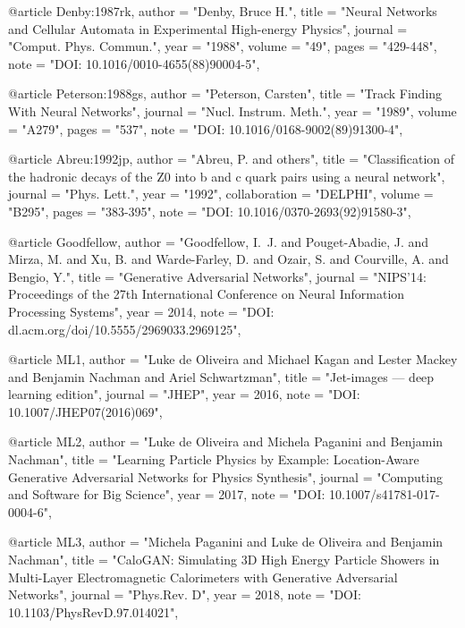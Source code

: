 @article{
	Denby:1987rk,
    author  = "Denby, Bruce H.",
    title   = "Neural Networks and Cellular Automata in Experimental High-energy Physics",
    journal = "Comput. Phys. Commun.",
    year    = "1988",
    volume  = "49",
    pages   = "429-448",
    note    = "DOI: 10.1016/0010-4655(88)90004-5",
}

@article{
	Peterson:1988gs,
    author  = "Peterson, Carsten",
    title   = "Track Finding With Neural Networks",
    journal = "Nucl. Instrum. Meth.",
    year    = "1989",
    volume  = "A279",
    pages   = "537",
    note    = "DOI: 10.1016/0168-9002(89)91300-4",
}

@article{
	Abreu:1992jp,
    author  = "Abreu, P. and others",
    title   = "Classification of the hadronic decays of the Z0 into b and c quark pairs using a neural network",
    journal = "Phys. Lett.",
    year    = "1992",
    collaboration   = "DELPHI",
    volume  = "B295",
    pages   = "383-395",
    note    = "DOI: 10.1016/0370-2693(92)91580-3",
}

@article{
    Goodfellow,
    author  = "Goodfellow, I.~J. and Pouget-Abadie, J. and Mirza, M. and Xu, B. and Warde-Farley, D. and Ozair, S. and Courville, A. and Bengio, Y.",
    title   = "Generative Adversarial Networks",
    journal = "NIPS'14: Proceedings of the 27th International Conference on Neural Information Processing Systems",
    year    = 2014,
    note    = "DOI: dl.acm.org/doi/10.5555/2969033.2969125",
}

@article{
    ML1,
    author  = "Luke de Oliveira and Michael Kagan and Lester Mackey and Benjamin Nachman and Ariel Schwartzman",
    title   = "Jet-images — deep learning edition",
    journal = "JHEP",
    year    = 2016,
    note    = "DOI: 10.1007/JHEP07(2016)069",
}

@article{
    ML2,
    author  = "Luke de Oliveira and Michela Paganini and Benjamin Nachman",
    title   = "Learning Particle Physics by Example: Location-Aware Generative Adversarial Networks for Physics Synthesis",
    journal = "Computing and Software for Big Science",
    year    = 2017,
    note    = "DOI: 10.1007/s41781-017-0004-6",
}

@article{
	ML3,
    author  = "Michela Paganini and Luke de Oliveira and Benjamin Nachman",
    title   = "CaloGAN: Simulating 3D High Energy Particle Showers in Multi-Layer Electromagnetic Calorimeters with Generative Adversarial Networks",
    journal = "Phys.Rev. D",
    year    = 2018,
    note    = "DOI: 10.1103/PhysRevD.97.014021",
}

